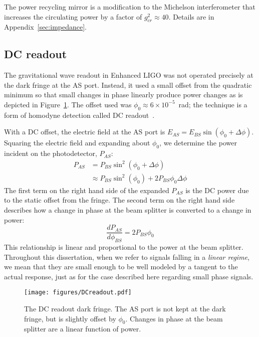 The power recycling mirror is a modification to the Michelson
interferometer that increases the circulating power by a factor of
$g_{cr}^2 \approx 40$. Details are in Appendix~\ref{sec:impedance}.


\subsection{DC readout}
\label{sec:DCreadout}
The gravitational wave readout in Enhanced LIGO was not operated
precisely at the dark fringe at the AS port. Instead, it used a small
offset from the quadratic minimum so that small changes in phase
linearly produce power changes as is depicted in
Figure~\ref{fig:DCreadout}. The offset used was $\phi_0 \approx 6
\times 10^{-5}$~rad; the technique is a form of homodyne detection
called DC readout~\cite{TobinThesis}.

With a DC offset, the electric field at the AS port is $E_{AS} =
E_{BS}\sin{(\phi_0 + \Delta\phi)}$. Squaring the electric field and
expanding about $\phi_0$, we determine the power incident on the
photodetector, $P_{AS}$:
\begin{align}
P_{AS} &= P_{BS} \sin^2{(\phi_0 + \Delta\phi)} \\
 &\approx P_{BS}\sin^2{(\phi_0)} + 2P_{BS}\phi_0\Delta\phi
\end{align}
The first term on the right hand side of the expanded $P_{AS}$ is the
DC power due to the static offset from the fringe. The second term on
the right hand side describes how a change in phase at the beam
splitter is converted to a change in power:
\begin{equation}
\frac{d P_{AS}}{d \phi_{BS}} =2 P_{BS} \phi_0 
\label{eq:dP_dphi}
\end{equation}
This relationship is linear and proportional to the power at the beam
splitter. Throughout this dissertation, when we refer to signals
falling in a \emph{linear regime}, we mean that they are small enough
to be well modeled by a tangent to the actual response, just as for
the case described here regarding small phase signals.

\begin{figure}
\begin{centering}
\texttt{[image: figures/DCreadout.pdf]}
\caption[The DC readout dark fringe]{The DC readout dark fringe. The
  AS port is not kept at the dark fringe, but is slightly offset by
  $\phi_0$. Changes in phase at the beam splitter are a linear
  function of power.}
\label{fig:DCreadout}
\end{centering}
\end{figure}



